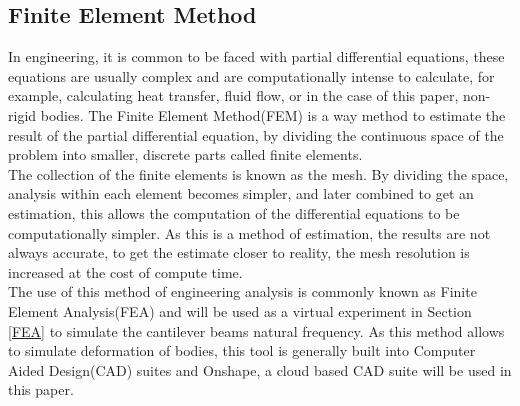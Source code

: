 \documentclass[a4paper,12pt]{article}
\begin{document}
    \subsection{Finite Element Method}\label{FEM}%
    In engineering, it is common to be faced with partial differential equations, these equations are usually complex and are computationally intense to calculate, for example, calculating heat transfer, fluid flow, or in the case of this paper, non-rigid bodies.
    The Finite Element Method(FEM) is a way method to estimate the result of the partial differential equation, by dividing the continuous space of the problem into smaller, discrete parts called finite elements.\\
    The collection of the finite elements is known as the mesh. By dividing the space, analysis within each element becomes simpler, and later combined to get an estimation, this allows the computation of the differential equations to be computationally simpler. As this is a method of estimation, the results are not always accurate, to get the estimate closer to reality, the mesh resolution is increased at the cost of compute time.\autocite{FEABook} \\
    The use of this method of engineering analysis is commonly known as Finite Element Analysis(FEA) and will be used as a virtual experiment in Section \ref{FEA} to simulate the cantilever beams natural frequency.
    As this method allows to simulate deformation of bodies, this tool is generally built into Computer Aided Design(CAD) suites and Onshape, a cloud based CAD suite will be used in this paper.\\
\end{document}

